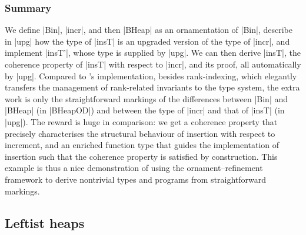 \subsubsection{Summary}

We define |Bin|, |incr|, and then |BHeap| as an ornamentation of |Bin|, describe in |upg| how the type of |insT| is an upgraded version of the type of |incr|, and implement |insT'|, whose type is supplied by |upg|.
We can then derive |insT|, the coherence property of |insT| with respect to |incr|, and its proof, all automatically by |upg|.
Compared to \citeauthor{Okasaki-data-structures}'s implementation, besides rank-indexing, which elegantly transfers the management of rank-related invariants to the type system, the extra work is only the straightforward markings of the differences between |Bin| and |BHeap| (in |BHeapOD|) and between the type of |incr| and that of |insT| (in |upg|).
The reward is huge in comparison: we get a coherence property that precisely characterises the structural behaviour of insertion with respect to increment, and an enriched function type that guides the implementation of insertion such that the coherence property is satisfied by construction.
This example is thus a nice demonstration of using the ornament--refinement framework to derive nontrivial types and programs from straightforward markings.

\subsection{Leftist heaps}
\label{sec:leftist-heaps}

